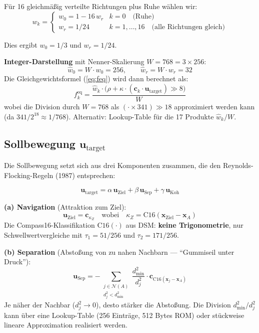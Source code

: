 \documentclass[11pt,a4paper]{article}
\newcommand{\feq}{f^{\mathrm{eq}}}
\newcommand{\compass}{\mathrm{C16}}
\begin{document}
F\"ur 16 gleichm\"a\ss ig verteilte Richtungen plus Ruhe w\"ahlen wir:
\begin{equation}
w_k = \begin{cases}
w_0 = 1 - 16\,w_r & k = 0 \quad \text{(Ruhe)} \\
w_r = 1/24 & k = 1,\ldots,16 \quad \text{(alle Richtungen gleich)}
\end{cases}
\end{equation}

Dies ergibt $w_0 = 1/3$ und $w_r = 1/24$.

\textbf{Integer-Darstellung} mit Nenner-Skalierung $W = 768 = 3 \times 256$:
\begin{equation}
\hat{w}_0 = W \cdot w_0 = 256, \qquad \hat{w}_r = W \cdot w_r = 32
\end{equation}
Die Gleichgewichtsformel (\ref{eq:feq}) wird dann berechnet als:
\begin{equation}
\feq_k = \frac{\hat{w}_k \cdot \big(\rho + \kappa \cdot (\mathbf{c}_k \cdot \mathbf{u}_{\mathrm{target}}) \gg 8\big)}{W}
\end{equation}
wobei die Division durch $W = 768$ als $(\cdot \times 341) \gg 18$ approximiert werden kann
(da $341/2^{18} \approx 1/768$). Alternativ: Lookup-Table f\"ur die 17 Produkte $\hat{w}_k / W$.

\subsection{Sollbewegung $\mathbf{u}_{\mathrm{target}}$}

Die Sollbewegung setzt sich aus drei Komponenten zusammen,
die den Reynolds-Flocking-Regeln (1987) entsprechen:

\begin{equation}\label{eq:utarget}
\mathbf{u}_{\mathrm{target}} = \alpha\,\mathbf{u}_{\mathrm{Ziel}}
+ \beta\,\mathbf{u}_{\mathrm{Sep}}
+ \gamma\,\mathbf{u}_{\mathrm{Koh}}
\end{equation}

\textbf{(a) Navigation} (Attraktion zum Ziel):
\begin{equation}
\mathbf{u}_{\mathrm{Ziel}} = \mathbf{c}_{\kappa_Z}
\quad\text{wobei}\quad
\kappa_Z = \compass(\mathbf{x}_{\mathrm{Ziel}} - \mathbf{x}_A)
\end{equation}
Die Compass16-Klassifikation $\compass(\cdot)$ aus DSM: \textbf{keine Trigonometrie},
nur Schwellwertvergleiche mit $\tau_1 = 51/256$ und $\tau_2 = 171/256$.

\textbf{(b) Separation} (Absto\ss ung von zu nahen Nachbarn --- ``Gummiseil unter Druck''):
\begin{equation}
\mathbf{u}_{\mathrm{Sep}} = -\sum_{\substack{j \in \mathcal{N}(A) \\ d^2_j < d^2_{\min}}}
\frac{d^2_{\min}}{d^2_j} \cdot \mathbf{c}_{\compass(\mathbf{x}_j - \mathbf{x}_A)}
\end{equation}
Je n\"aher der Nachbar ($d^2_j \to 0$), desto st\"arker die Absto\ss ung.
Die Division $d^2_{\min}/d^2_j$ kann \"uber eine Lookup-Table (256 Eintr\"age, 512 Bytes ROM)
oder st\"uckweise lineare Approximation realisiert werden.
\end{document}
